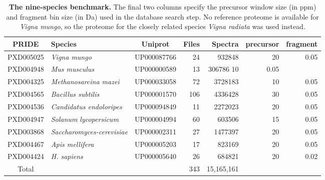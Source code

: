 \documentclass{article}
\begin{document}
\begin{table}
\scriptsize
\centering
\begin{tabular}{clcrrrr}
\hline
PRIDE & Species & Uniprot & Files & Spectra & precursor & fragment \\
\hline
PXD005025 & \textit{Vigna mungo} & UP000087766 & 24 & 932848 & 20 & 0.05 \\
PXD004948 & \textit{Mus musculus} & UP000000589 & 13 & 306786 10 & 0.05 \\
PXD004325 & \textit{Methanosarcina mazei} & UP000033058  & 72 & 3728183 & 10 & 0.05 \\
PXD004565 & \textit{Bacillus subtilis} & UP000001570 & 106 & 4336428 & 30 & 0.05 \\
PXD004536 & \textit{Candidatus endoloripes} & UP000094849 & 11 & 2272023 & 20 & 0.05 \\
PXD004947 & \textit{Solanum lycopersicum} & UP000004994 & 60 & 603506 & 15 & 0.05 \\
PXD003868 & \textit{Saccharomyces-cerevisiae} & UP000002311 & 27 & 1477397 & 20 & 0.05 \\
PXD004467 & \textit{Apis mellifera} & UP000005203 & 17 & 823169 & 20 & 0.05 \\
PXD004424 & \textit{H. sapiens} & UP000005640 & 26 & 684821 & 20 & 0.02 \\
\hline
Total & & & 343 & 15,165,161 \\
\end{tabular}
\caption{{\bf The nine-species benchmark.}
The final two columns specify the precursor window size (in ppm) and fragment bin size (in Da) used in the database search step.
No reference proteome is available for \textit{Vigna mungo}, so the proteome for the closely related species \textit{Vigna radiata} was used instead.
}
\label{tab:benchmark}
\end{table}
\end{document}
